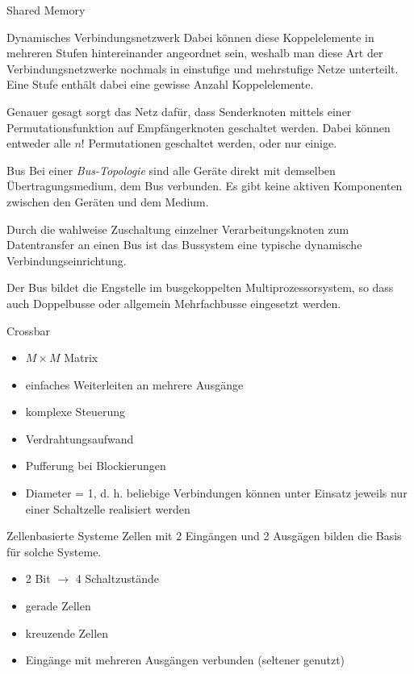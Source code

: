 \begin{defi}{Shared Memory}
\begin{defi}{Dynamisches Verbindungsnetzwerk}
        Dabei können diese Koppelelemente in mehreren Stufen hintereinander angeordnet sein, weshalb man diese Art der Verbindungsnetzwerke nochmals in einstufige und mehrstufige Netze unterteilt.
        Eine Stufe enthält dabei eine gewisse Anzahl Koppelelemente.

        Genauer gesagt sorgt das Netz dafür, dass Senderknoten mittels einer Permutationsfunktion auf Empfängerknoten geschaltet werden.
        Dabei können entweder alle $n!$ Permutationen geschaltet werden, oder nur einige.
    \end{defi}

    \begin{defi}{Bus}
        Bei einer \emph{Bus-Topologie} sind alle Geräte direkt mit demselben Übertragungsmedium, dem Bus verbunden.
        Es gibt keine aktiven Komponenten zwischen den Geräten und dem Medium.

        Durch die wahlweise Zuschaltung einzelner Verarbeitungsknoten zum Datentransfer an einen Bus ist das Bussystem eine typische dynamische Verbindungseinrichtung.

        Der Bus bildet die Engstelle im busgekoppelten Multiprozessorsystem, so dass auch Doppelbusse oder allgemein Mehrfachbusse eingesetzt werden.
    \end{defi}

    \begin{defi}{Crossbar}
        \begin{itemize}
            \item $M \times M$ Matrix
            \item einfaches Weiterleiten an mehrere Ausgänge
            \item komplexe Steuerung
            \item Verdrahtungsaufwand
            \item Pufferung bei Blockierungen
            \item Diameter = 1, d. h. beliebige Verbindungen können unter Einsatz jeweils nur einer Schaltzelle realisiert werden
        \end{itemize}
    \end{defi}

    \begin{defi}{Zellenbasierte Systeme}
        Zellen mit 2 Eingängen und 2 Ausgägen bilden die Basis für solche Systeme.
        \begin{itemize}
            \item 2 Bit $\to$ 4 Schaltzustände
            \item gerade Zellen
            \item kreuzende Zellen
            \item Eingänge mit mehreren Ausgängen verbunden (seltener genutzt)
        \end{itemize}
    \end{defi}


\end{defi}

